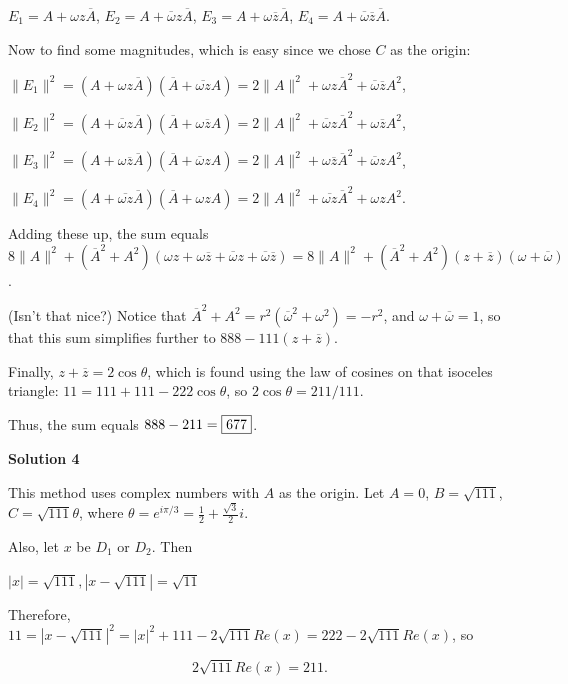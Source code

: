 \begin{enumerate}
 $E_1=A+\omega z \overline{A}$, $E_2=A+\overline{\omega} z \overline{A}$, $E_3=A+\omega\overline{z}\overline{A}$, $E_4=A+\overline{\omega}\overline{z}\overline{A}$.

 Now to find some magnitudes, which is easy since we chose $C$ as the origin:

 $\|E_1\|^2=(A+\omega z \overline{A})(\overline{A}+\overline{\omega z}A)=2\|A\|^2+\omega z \overline{A}^2 + \overline{\omega}\overline{z}A^2$,

 $\|E_2\|^2=(A+\overline{\omega} z \overline{A})(\overline{A}+\omega \overline{z}A)=2\|A\|^2+\overline{\omega} z \overline{A}^2 + \omega\overline{z}A^2$,

 $\|E_3\|^2=(A+\omega \overline{z} \overline{A})(\overline{A}+\overline{\omega} z A)=2\|A\|^2+\omega \overline{z} \overline{A}^2 + \overline{\omega}zA^2$,

 $\|E_4\|^2=(A+\overline{\omega z} \overline{A})(\overline{A}+\omega zA)=2\|A\|^2+\overline{\omega z} \overline{A}^2 + \omega zA^2$.

 Adding these up, the sum equals $8\|A\|^2+(\overline{A}^2+A^2)(\omega z + \omega \overline{z} + \overline{\omega}z + \overline{\omega}\overline{z}) = 8\|A\|^2+(\overline{A}^2+A^2)(z + \overline{z})( \omega+ \overline{\omega})$.  

 (Isn't that nice?)  Notice that $\overline{A}^2+A^2 = r^2(\overline{\omega}^2+\omega^2) = -r^2$, and $\omega+ \overline{\omega}=1$, so that this sum simplifies further to $888-111(z + \overline{z})$.  

 Finally, $z + \overline{z} = 2\cos{\theta}$, which is found using the law of cosines on that isoceles triangle: $11=111+111-222\cos{\theta}$, so $2\cos{\theta}=211/111$.

 Thus, the sum equals $888-211=\framebox{677}$.

 



\textbf{Solution 4}

This method uses complex numbers with $A$ as the origin. Let $A=0$, $B=\sqrt{111}$, $C = \sqrt{111}\theta$, where $\theta = e^{i \pi/3} = \frac{1}{2} + \frac{\sqrt{3}}{2}i$.

 Also, let $x$ be $D_1$ or $D_2$. Then

 $|x|=\sqrt{111}, |x-\sqrt{111}|=\sqrt{11}$

 Therefore, $11 = |x-\sqrt{111}|^2 = |x|^2 + 111 -2\sqrt{111}Re(x) = 222 - 2\sqrt{111}Re(x)$, so

 
 \[2\sqrt{111}Re(x) = 211.\]


\end{enumerate}
